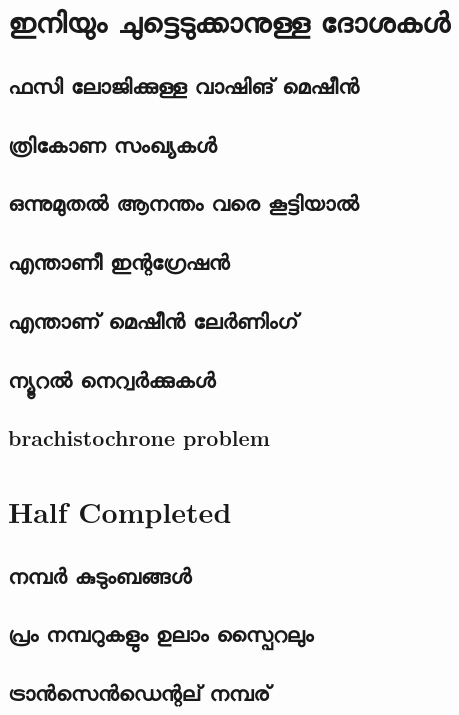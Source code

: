 \documentclass[10pt,a4paper]{report}
\begin{document}
\section{ഇനിയും ചുട്ടെടുക്കാനുള്ള ദോശകൾ }
 \subsection{ ഫസി ലോജിക്കുള്ള  വാഷിങ് മെഷീൻ }

\subsection{ത്രികോണ സംഖ്യകൾ  }

\subsection{ ഒന്നുമുതൽ ആനന്തം വരെ കൂട്ടിയാൽ }

\subsection{എന്താണീ ഇന്റഗ്രേഷൻ }

\subsection{എന്താണ് മെഷീൻ ലേർണിംഗ് }

\subsection{ ന്യൂറൽ നെറ്വർക്കുകൾ }
\subsection{brachistochrone problem }

\section{Half Completed}

\subsection{നമ്പർ  കുടുംബങ്ങൾ }

\subsection{പ്രം നമ്പറുകളും  ഉലാം സ്പൈറലും }
\subsection{ട്രാൻസെൻഡെന്റല് നമ്പര് }
\end{document}

